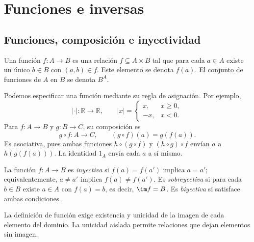 \section{Funciones e inversas}
\subsection{Funciones, composición e inyectividad}
\begin{defi}
Una función $f:A\to B$ es una relación $f\subseteq A\times B$ tal que para cada $a\in A$ existe un único $b\in B$ con $(a,b)\in f$. Este elemento se denota $f(a)$. El conjunto de funciones de $A$ en $B$ se denota $B^A$.
\end{defi}
Podemos especificar una función mediante su regla de asignación. Por ejemplo,
\[
|\cdot|:\mathbb R\to\mathbb R,\qquad
|x|=\begin{cases}x,&x\ge0,\\-x,&x<0.\end{cases}
\]
Para $f:A\to B$ y $g:B\to C$, su composición es
\[
g\circ f:A\to C,\qquad (g\circ f)(a)=g(f(a)).
\]
Es asociativa, pues ambas funciones $h\circ(g\circ f)$ y $(h\circ g)\circ f$ envían $a$ a $h(g(f(a)))$. La identidad $1_A$ envía cada $a$ a sí mismo.

\begin{defi}
La función $f:A\to B$ es \emph{inyectiva} si $f(a)=f(a')$ implica $a=a'$; equivalentemente, $a\ne a'$ implica $f(a)\ne f(a')$. Es \emph{sobreyectiva} si para cada $b\in B$ existe $a\in A$ con $f(a)=b$, es decir, $\im f=B$. Es \emph{biyectiva} si satisface ambas condiciones.
\end{defi}

\begin{obs}
La definición de función exige existencia y unicidad de la imagen de cada elemento del dominio. La unicidad aislada permite relaciones que dejan elementos sin imagen.
\end{obs}

